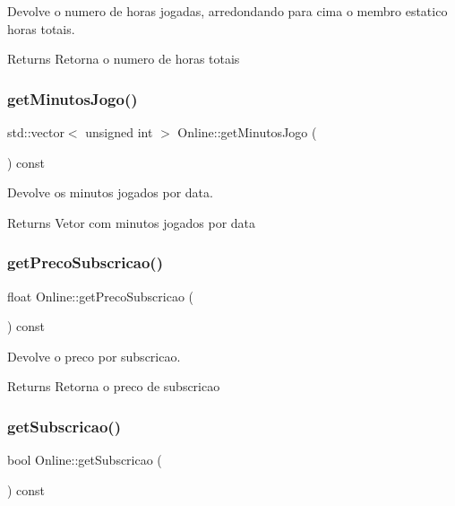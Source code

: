 Devolve o numero de horas jogadas, arredondando para cima o membro estatico horas totais. 

\begin{DoxyReturn}{Returns}
Retorna o numero de horas totais 
\end{DoxyReturn}
\mbox{\label{class_online_a4ab18dfdaa0af23cda8f5268a9968887}} 
\subsubsection{\texorpdfstring{get\+Minutos\+Jogo()}{getMinutosJogo()}}
{\footnotesize\ttfamily std\+::vector$<$ unsigned int $>$ Online\+::get\+Minutos\+Jogo (\begin{DoxyParamCaption}{ }\end{DoxyParamCaption}) const}



Devolve os minutos jogados por data. 

\begin{DoxyReturn}{Returns}
Vetor com minutos jogados por data 
\end{DoxyReturn}
\mbox{\label{class_online_a0f7240aa5582e10579d0719e4fa5d705}} 
\subsubsection{\texorpdfstring{get\+Preco\+Subscricao()}{getPrecoSubscricao()}}
{\footnotesize\ttfamily float Online\+::get\+Preco\+Subscricao (\begin{DoxyParamCaption}{ }\end{DoxyParamCaption}) const}



Devolve o preco por subscricao. 

\begin{DoxyReturn}{Returns}
Retorna o preco de subscricao 
\end{DoxyReturn}
\mbox{\label{class_online_aa222489df5a1e6bcfbf5e01d95178850}} 
\subsubsection{\texorpdfstring{get\+Subscricao()}{getSubscricao()}}
{\footnotesize\ttfamily bool Online\+::get\+Subscricao (\begin{DoxyParamCaption}{ }\end{DoxyParamCaption}) const}



